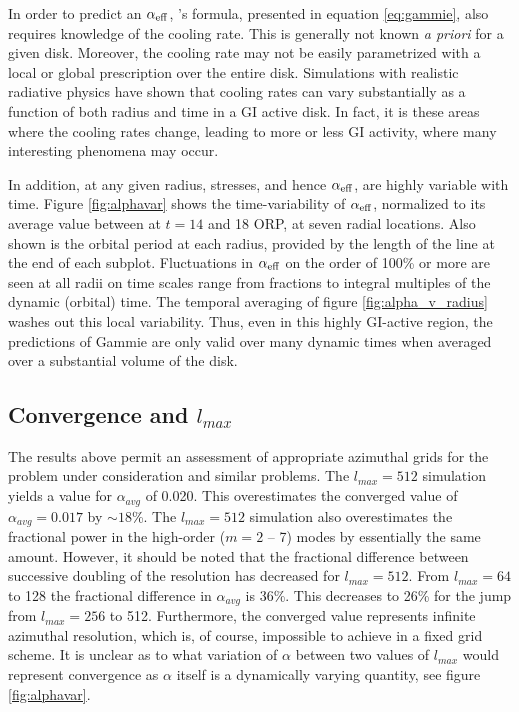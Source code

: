 \documentclass[manuscript]{aastex}
\begin{document}
In order to predict an $\alpha_{\rm{eff}}$, \citeauthor{gammie2001}'s formula, presented in equation \eqref{eq:gammie}, also requires knowledge of the cooling rate. This is generally not known {\it a priori} for a given disk. Moreover, the cooling rate may not be easily parametrized with a local or global prescription over the entire disk. Simulations with realistic radiative physics \citep{boley2006} have shown that cooling rates can vary substantially as a function of both radius and time in a GI active disk. In fact, it is these areas where the cooling rates change, leading to more or less GI activity, where many interesting phenomena may occur. 

In addition, at any given radius, 
stresses, and hence $\alpha_{\rm{eff}}$, are highly variable with time.
Figure \ref{fig:alphavar} shows the time-variability of $\alpha_{\rm{eff}}$, 
normalized to its average value between at $t = 14$ and 18 ORP, at seven radial locations.   
Also shown is the orbital period at each radius, provided by the length of the line at the end of each subplot. 
Fluctuations in $\alpha_{\rm{eff}}$
on the order of 100\% or more are seen at all radii
on  time scales range from fractions to integral multiples of the dynamic (orbital) time.  The temporal averaging
of figure \ref{fig:alpha_v_radius} washes out this local variability.
Thus,
even in this highly GI-active region, the predictions of Gammie are only valid over many dynamic times 
when averaged over a substantial volume of the disk.

\subsection{Convergence and $l_{max}$}

The results above permit an assessment of appropriate azimuthal grids for the
problem under consideration and similar problems. The $l_{max} = 512$ simulation yields a value 
for $\alpha_{avg}$ of 0.020. This overestimates the converged value of $\alpha_{avg}
= 0.017$ by $\sim 18$\%. The $l_{max} = 512$ simulation also overestimates the fractional
power in the high-order ($m = 2$ -- 7) modes by essentially the same amount. However, it should be noted that the fractional difference between successive doubling of the resolution has decreased for $l_{max} = 512$. From $l_{max} =64$ to 128 the fractional difference in $\alpha_{avg}$ is 36\%. This decreases to 26\% for the jump from $l_{max} = 256$ to 512. Furthermore, the converged value represents infinite azimuthal resolution, which is, of course, impossible to achieve in a fixed grid scheme. It is unclear as to what variation of $\alpha$ between two values of $l_{max}$ would represent convergence as $\alpha$ itself is a dynamically varying quantity, see figure \ref{fig:alphavar}. 
\end{document}
